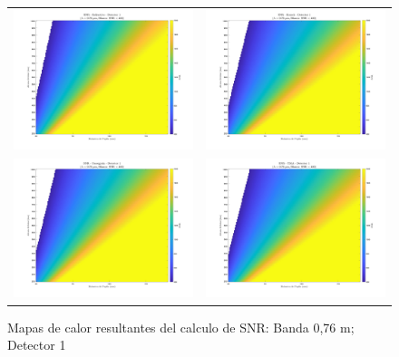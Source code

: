 \begin{landscape}
\begin{figure}[p]
\centering
\vspace*{0.3cm}


\vspace{0.3cm}
\setlength{\tabcolsep}{4pt}
\renewcommand{\arraystretch}{0}

\begin{tabular}{cc}
\includegraphics[width=0.48\linewidth]{4.Payload/SNR/SNR_Lambda3_Detector4_Telescopio1_heatmap.jpg} &
\includegraphics[width=0.48\linewidth]{4.Payload/SNR/SNR_Lambda3_Detector4_Telescopio2_heatmap.jpg} \\
\includegraphics[width=0.48\linewidth]{4.Payload/SNR/SNR_Lambda3_Detector4_Telescopio3_heatmap.jpg} &
\includegraphics[width=0.48\linewidth]{4.Payload/SNR/SNR_Lambda3_Detector4_Telescopio4_heatmap.jpg} \\
\end{tabular}
\caption{Mapas de calor resultantes del calculo de SNR: Banda 0,76 \textmu m; Detector 1}
\end{figure}
\end{landscape}

